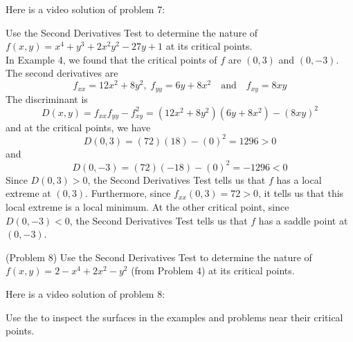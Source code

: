 \documentclass[handout]{ximera}
\begin{document}
Here is a video solution of problem 7:\\
\begin{foldable}
\end{foldable}

\begin{example}[Example 8]
Use the Second Derivatives Test to determine the nature of  $f(x,y) = x^4 + y^3 + 2x^2y^2 -27y + 1$ at its critical points.\\
In Example 4, we found that the critical points of $f$ are $(0, 3)$ and $(0, -3)$.
The second derivatives are
\[
f_{xx} = 12x^2 + 8y^2,\; f_{yy} = 6y + 8x^2 \quad \text{and} \quad f_{xy} = 8xy
\]
The discriminant is
\[
D(x,y) = f_{xx} f_{yy} - f_{xy}^2 = (12x^2 + 8y^2)(6y + 8x^2) - (8xy)^2
\]
and at the critical points, we have
\[
D(0, 3)  = (72)(18) - (0)^2 = 1296 > 0
\]
and
\[
D(0, -3)  = (72)(-18) - (0)^2 = -1296 < 0
\]
Since $D(0, 3) > 0$, the Second Derivatives Test tells us that $f$ has a local extreme at $(0, 3)$. Furthermore, since
$f_{xx} (0,3) = 72 > 0$, it tells us that this local extreme is a local minimum. At the other critical point,
since $D(0, -3) < 0$, the Second Derivatives Test tells us that $f$ has a saddle point at $(0, -3)$.
\end{example}

\begin{problem}(Problem 8)
Use the Second Derivatives Test to determine the nature of  $f(x,y) = 2-x^4 + 2x^2 - y^2$ 
(from Problem 4) at its critical points.\\
\end{problem}

Here is a video solution of problem 8:\\
\begin{foldable}
\end{foldable}


Use the  to inspect
the surfaces in the examples and problems near their critical points.
\end{document}
